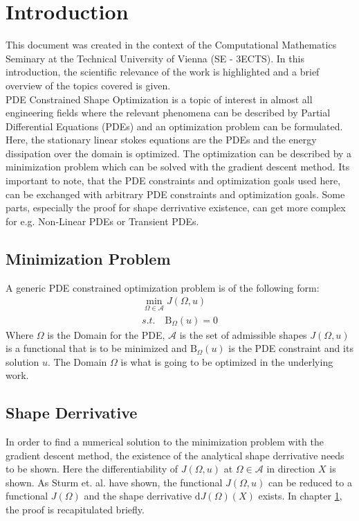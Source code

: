 \section{Introduction}

This document was created in the context of the Computational Mathematics Seminary
at the Technical University of Vienna (SE - 3ECTS). In this introduction, the scientific relevance
of the work is highlighted and a brief overview of the topics covered is given.\\

PDE Constrained Shape Optimization is a topic of interest in almost all engineering fields
where the relevant phenomena can be described by Partial Differential Equations (PDEs) and
an optimization problem can be formulated. Here, the stationary linear stokes equations are
the PDEs and the energy dissipation over the domain is optimized. The optimization can 
be described by a minimization problem which can be solved with the gradient descent method.
Its important to note, that the PDE constraints and optimization goals used here, 
can be exchanged with arbitrary PDE constraints and optimization goals. Some parts,
especially the proof for shape derrivative existence, can get more complex for e.g. 
Non-Linear PDEs or Transient PDEs.\\

\subsection*{Minimization Problem}
A generic PDE constrained optimization problem is of the following form:
\begin{align*}
        \min_{ \Omega \in \mathcal{A} } J( \Omega, u) \\
        s.t. \quad \mathrm{B}_{\Omega}(u) = 0
\end{align*}
Where $\Omega$ is the Domain for the PDE, $\mathcal{A}$ is the set of admissible shapes
$J(\Omega, u)$ is a functional that is to be minimized and $\mathrm{B}_{\Omega}(u)$ is the PDE
constraint and its solution $u$. The Domain $\Omega$ is what is going to be 
optimized in the underlying work. \\

\subsection*{Shape Derrivative}
In order to find a numerical solution to the minimization problem with the gradient descent
method, the existence of the analytical shape derrivative needs to be shown. Here the
differentiability of $J(\Omega,u)$ at $\Omega \in \mathcal{A}$ in direction $X$ is shown. 
As Sturm et. al. \cite{nearly_conformal_paper} have shown, the functional 
$J(\Omega, u)$ can be reduced to a functional $J(\Omega)$ and the shape derrivative 
$\mathrm{d}J(\Omega)(X)$ exists. In chapter \ref*{}, the proof is recapitulated briefly.

